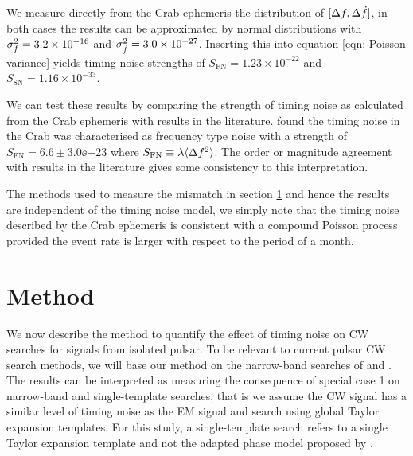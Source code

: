 \documentclass[../full_thesis/full_thesis.tex]{subfiles}
\begin{document}
{%

We measure directly from the Crab ephemeris the distribution of
$[\Delta f,\Delta\dot{f}]$, in both  cases the results can be approximated by
normal distributions with $\sigma_{f}^{2}=3.2\times10^{-16}$ and
$\sigma_{\dot{f}}^{2}=3.0\times10^{-27}$. Inserting this into equation
\eqref{eqn: Poisson variance} yields timing noise strengths of
$S_{\textrm{FN}}=1.23\times10^{-22}$ and $S_{\textrm{SN}}=1.16\times10^{-33}$.

We can test these results by comparing the strength of timing noise as
calculated from the Crab ephemeris with results in the literature.
\citet{Cordes1981} found the timing noise in the Crab was characterised  as
frequency type noise with a strength of $S_{\textrm{FN}}=6.6 \pm 3.0 \ee{-23}$
where $S_{\textrm{FN}} \equiv \lambda \langle\Delta f^{2}\rangle$.  The order
or magnitude agreement with results in the literature gives some consistency to
this interpretation.

The methods used to measure the mismatch in section \ref{sec: narrow-band method} and hence
the results are independent of the timing noise model, we simply note that the
timing noise described by the Crab ephemeris is consistent with a compound
Poisson process provided the event rate is larger with respect to the period of
a month.
}


\section{Method}
\label{sec: narrow-band method}
We now describe the method to quantify the effect of timing noise on CW
searches for signals from isolated pulsar.
To be relevant to current pulsar CW search methods, we will base our
method on the narrow-band searches of \citet{ligo2008} and \citet{LIGO2015}. The results can be interpreted as measuring the consequence of
special case 1 on narrow-band and single-template searches; that is we assume
the CW signal has a similar level of timing noise as the EM signal and search
using global Taylor expansion templates. For this study, a single-template
search refers to a single Taylor expansion template and not the adapted phase
model proposed by \citet{Pitkin2004}.
\end{document}
